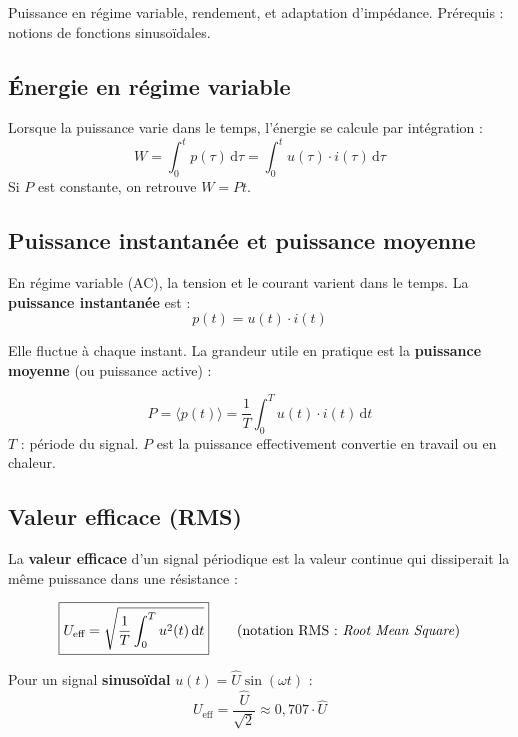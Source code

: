 \documentclass[12pt,a4paper,twoside]{book}
\begin{document}
\begin{approfondissement}
Puissance en régime variable, rendement, et adaptation d'impédance. Prérequis : notions de fonctions sinusoïdales.
\end{approfondissement}

\subsection{Énergie en régime variable}

Lorsque la puissance varie dans le temps, l'énergie se calcule par intégration :
\[
W = \int_0^t p(\tau)\,\mathrm{d}\tau = \int_0^t u(\tau)\cdot i(\tau)\,\mathrm{d}\tau
\]
Si $P$ est constante, on retrouve $W = Pt$.

\subsection{Puissance instantanée et puissance moyenne}

En régime variable (AC), la tension et le courant varient dans le temps. La \textbf{puissance instantanée} est :
\[
p(t) = u(t) \cdot i(t)
\]

Elle fluctue à chaque instant. La grandeur utile en pratique est la \textbf{puissance moyenne} (ou puissance active) :

\begin{formule}
\[
\boxed{P = \langle p(t) \rangle = \frac{1}{T}\int_0^T u(t)\cdot i(t)\,\mathrm{d}t}
\]
$T$ : période du signal. $P$ est la puissance effectivement convertie en travail ou en chaleur.
\end{formule}

\subsection{Valeur efficace (RMS)}

La \textbf{valeur efficace} d'un signal périodique est la valeur continue qui dissiperait la même puissance dans une résistance :

\begin{formule}
\[
\boxed{U_{\text{eff}} = \sqrt{\frac{1}{T}\int_0^T u^2(t)\,\mathrm{d}t}} \qquad \text{(notation RMS : \textit{Root Mean Square})}
\]
\end{formule}

Pour un signal \textbf{sinusoïdal} $u(t) = \hat{U}\sin(\omega t)$ :
\[
U_{\text{eff}} = \frac{\hat{U}}{\sqrt{2}} \approx 0{,}707 \cdot \hat{U}
\]
\end{document}

